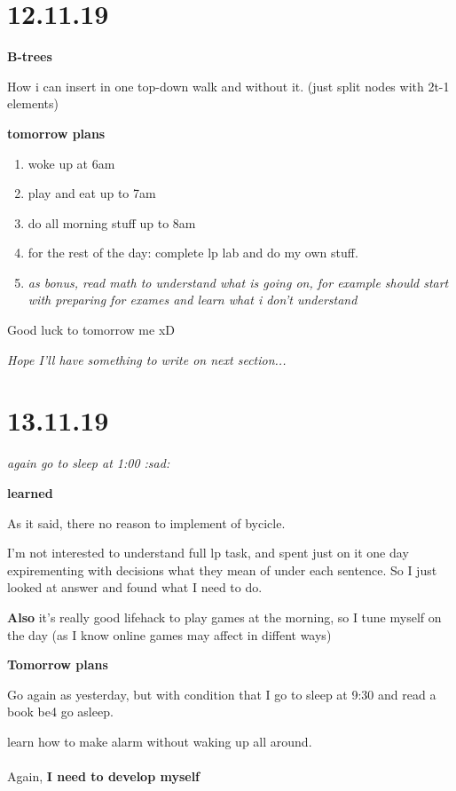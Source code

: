 \documentclass[12pt,a4paper,titlepage]{article}
\begin{document}
\newpage
\section{12.11.19}
\begin{center}
  \textbf{B-trees}
\end{center}
How i can insert in one top-down walk and without it. (just split nodes
with 2t-1 elements)
\begin{center}
  \textbf{tomorrow plans} 
\end{center}
\begin{enumerate}
  \item woke up at 6am
  \item play and eat up to 7am
  \item do all morning stuff up to 8am
  \item for the rest of the day: complete lp lab and do my own stuff.
  \item \textit{as bonus, read math to understand what is going on, for
    example should start with preparing for exames and learn what i
  don't understand}
\end{enumerate}
\par Good luck to tomorrow me xD
\par \textit{Hope I'll have something to write on next section...}

\newpage
\section{13.11.19}
\textit{again go to sleep at 1:00 :sad:}
\begin{center}
  \textbf{learned}
\end{center}
As it said, there no reason to implement of bycicle.\par
I'm not interested to understand full lp task, and spent just on it one
day expirementing with decisions what they mean of under each sentence.
So I just looked at answer and found what I need to do.\par
\textbf{Also} it's really good lifehack to play games at the morning, so
I tune myself on the day (as I know online games may affect in diffent
ways)
\begin{center}
  \textbf{Tomorrow plans}
\end{center}
Go again as yesterday, but with condition that I go to sleep at 9:30 and
read a book be4 go asleep.\par
learn how to make alarm without waking up all around.
\\
\\
Again, \textbf{I need to develop myself}
\end{document}
